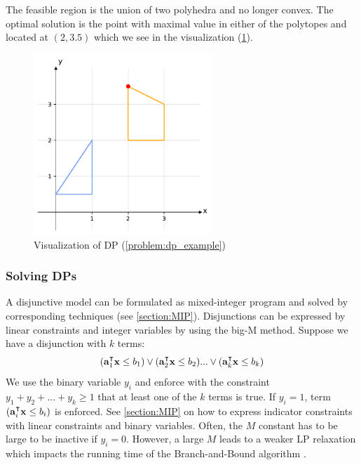 The feasible region is the union of two polyhedra and no longer convex. The optimal solution is the point with maximal value in either of the polytopes and located at $(2, 3.5)$ which we see in the visualization (\cref{fig:dp}). 

\begin{figure}[h!]
    \centering
    \includegraphics[width=0.6\textwidth]{Images/dp.pdf}
    \caption{Visualization of DP (\cref{problem:dp_example})}
    \label{fig:dp}
\end{figure}

\subsubsection*{Solving DPs}  \label{section:solving_dps}
A disjunctive model can be formulated as mixed-integer program and solved by corresponding techniques (see \cref{section:MIP}). Disjunctions can be expressed by linear constraints and integer variables by using the big-M method. Suppose we have a disjunction with $k$ terms:
\begin{equation*}
    (\bold a_1^\intercal \bold x \leq b_1) \lor (\bold a_2^\intercal \bold x \leq b_2) ... \lor (\bold a_k^\intercal \bold x \leq b_k)
\end{equation*}
We use the binary variable $y_i$ and enforce with the constraint $y_1 +  y_2 + ... + y_k \geq 1$ that at least one of the $k$ terms is true. If $y_i=1$, term $(\bold a_i^\intercal \bold x \leq b_i)$ is enforced. See \cref{section:MIP} on how to express indicator constraints with linear constraints and binary variables. Often, the $M$ constant has to be large to be inactive if $y_i=0$. However, a large $M$ leads to a weaker LP relaxation which impacts the running time of the Branch-and-Bound algorithm \cite{aps_mosek_nodate}. 

